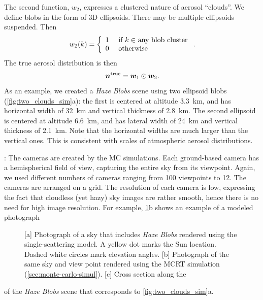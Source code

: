 \documentclass[10pt,letterpaper]{article}
\newcommand{\yoavcomment}[1]{}
\renewcommand{\yoavcomment}[1]{#1} %
\begin{document}
The second function, $w_2$, expresses a clustered nature of aerosol
``clouds''. We define blobs in the form of 3D ellipsoids. There may be
multiple ellipsoids suspended.  Then
\begin{equation}
  w_2(k) =
  \left\{
    \begin{array}{ll}
      1  & \mbox{ if $k\in$ any blob cluster} \\
      0  & \mbox{ otherwise}
      \label{eq:f2}
    \end{array}
  \right.
  .
  \hspace{-0.05cm}
\end{equation}
The true aerosol distribution is then
\begin{equation}
  \label{eq:ntrue}
  {\bm n}^{\rm true}={\bm w}_1\odot {\bm w}_2  .
  \hspace{-0.05cm}
\end{equation}
As an example, we created a {\em Haze Blobs} scene using two ellipsoid
blobs (\cref{fig:two_clouds_sim}a): the first is centered at altitude
\SI{3.3}{\km}, and has horizontal width of \SI{32}{\km} and vertical
thickness of \SI{2.8}{\km}. The second ellipsoid is centered at
altitude \SI{6.6}{\km}, and has lateral width of \SI{24}{\km} and
vertical thickness of \SI{2.1}{\km}. Note that the horizontal widths
are much larger than the vertical ones. This is consistent with scales
of atmospheric aerosol distributions.

: The cameras are created by the MC simulations.
Each ground-based camera has a hemispherical field of view, capturing
the entire sky from its viewpoint. Again, we used different numbers of
cameras ranging from 100 viewpoints to 12. The cameras are arranged on
a grid.  The resolution of each camera is low, expressing the fact
that cloudless (yet hazy) sky images are rather smooth, hence there is
no need for high image resolution.  For example,
\cref{fig:simulation-results1}b shows an example of a modeled
photograph
\begin{figure}
  \centering
  \yoavcomment{\def\svgwidth{0.95\columnwidth}}
  \caption{\small [a] Photograph of a sky that includes {\em Haze
      Blobs} rendered using the single-scattering model.  A yellow dot
    marks the Sun location. Dashed white circles mark elevation
    angles.  [b] Photograph of the same sky and view point rendered
    using the MCRT simulation (\cref{sec:monte-carlo-simul}).
    [c] Cross section along the
  }
  \label{fig:simulation-results1}
\end{figure}
of the {\em Haze Blobs} scene that corresponds to
\cref{fig:two_clouds_sim}a.
\end{document}
